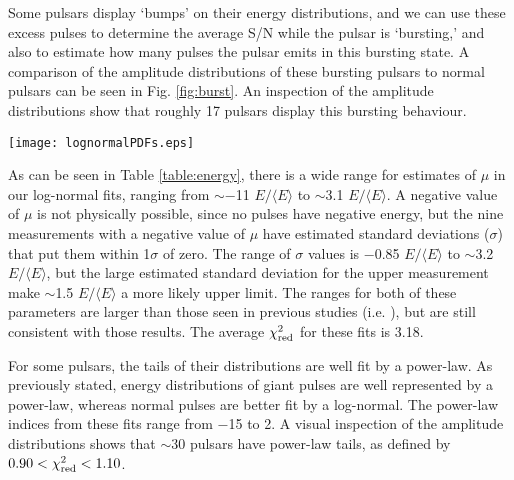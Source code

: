\documentclass[fleqn,usenatbib]{mnras}
\begin{document}
Some pulsars display `bumps' on their energy distributions, and we can use these excess pulses to 
determine the average S/N while the pulsar is `bursting,' and also to estimate how many pulses the 
pulsar emits in this bursting state. A comparison of the amplitude distributions of these bursting 
pulsars to normal pulsars can be seen in Fig. \ref{fig:burst}. An inspection of the amplitude 
distributions show that roughly 17 pulsars display this bursting behaviour.

\begin{figure*}
\centering
\texttt{[image: lognormalPDFs.eps]}
\caption[Examples of Log-normal Fits to Amplitude Distributions]{Amplitude distributions with 
log-normal fits. The two plots on the left are examples of normal pulsars, while the two plots on 
the right show `bumps' in their distributions that indicate bursting pulsars. Here, normalised
energy is defined as the individual pulse energy divided by the average energy of all pulses. The 
pulsars are, clockwise from top left, PSRs J0729$-$1836, J1741$-$3016, J1820$-$1346, and 
J1038$-$5831.}
\label{fig:burst}
\end{figure*}

As can be seen in Table \ref{table:energy}, there is a wide range for estimates of $\mu$ in our log-normal fits, ranging from $\sim-$11 $E/\langle{E}\rangle$ to $\sim$3.1 $E/\langle{E}\rangle$. A negative value of $\mu$ is not physically possible, since no pulses have negative energy, but the nine measurements with a negative value of $\mu$ have estimated standard deviations ($\sigma$) that put them within 1$\sigma$ of zero. The range of $\sigma$ values is $-$0.85 $E/\langle{E}\rangle$ to         
$\sim$3.2 $E/\langle{E}\rangle$, but the large estimated standard deviation for the upper 
measurement make $\sim$1.5 $E/\langle{E}\rangle$ a more likely upper limit. The ranges for both of 
these parameters are larger than those seen in previous studies (i.e. \citet{Burke-Spolaor:2012}), 
but are still consistent with those results. The average $\chi_{\rm red}^2$ for these fits is 3.18.

For some pulsars, the tails of their distributions are well fit by a power-law. As previously 
stated, energy distributions of giant pulses are well represented by a power-law, whereas normal 
pulses are better fit by a log-normal. The power-law indices from these fits range from $-$15 to 
2. A visual inspection of the amplitude distributions shows that $\sim$30 pulsars have power-law tails, as defined by $0.90 < \chi_{\rm red}^2 < 1.10$.                              
\end{document}
